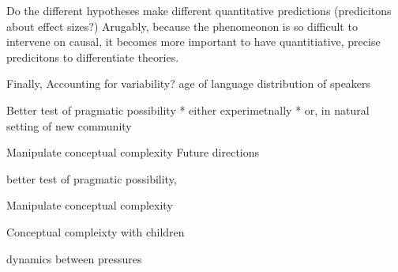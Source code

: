Do the different hypotheses make different quantitative predictions (predicitons about effect sizes?) Arugably, because the phenomeonon is so difficult to intervene on causal, it becomes more important to have quantitiative, precise predicitons to differentiate theories.

 


 Finally, Accounting for variability?
 age of language
 distribution of speakers



Better test of pragmatic possibility
* either experimetnally
* or, in natural setting of new community
   
  Manipulate conceptual complexity
Future directions


 


better test of pragmatic possibility, 

   Manipulate conceptual complexity

Conceptual compleixty with children






dynamics between pressures

   